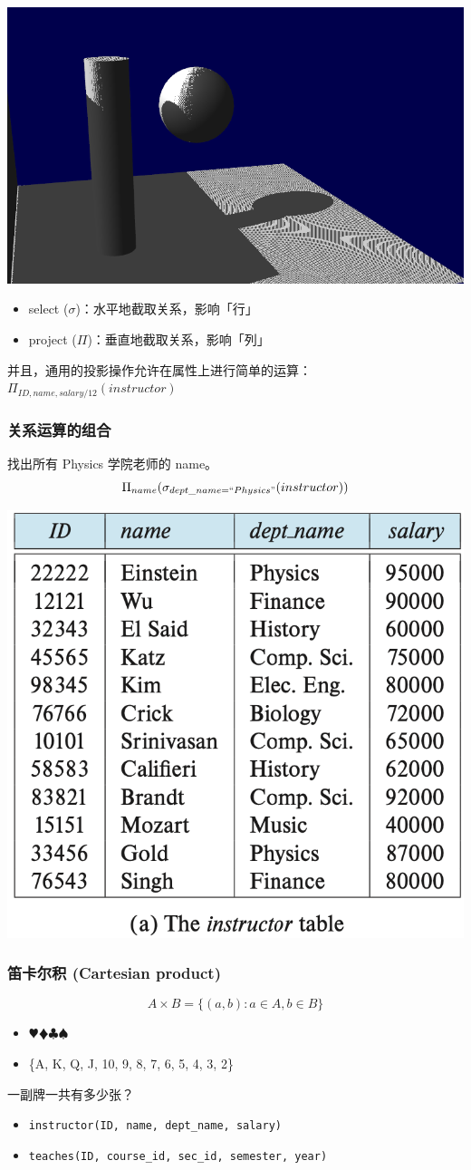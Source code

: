 \documentclass[aspectratio=169, 14pt]{beamer}
\begin{document}
\begin{frame}
	\begin{center}
		\includegraphics[width=.45\textwidth]{image/project}
	\end{center}

	\begin{itemize}
		\item select ($\sigma$)：\alert{水平地}截取关系，影响「行」
		\item project ($\Pi$)：\alert{垂直地}截取关系，影响「列」
	\end{itemize}
	\pause
	并且，通用的投影操作允许在属性上进行简单的运算：\large{\(\Pi_{ID, name, salary/12}(instructor)\)}

\end{frame}

\begin{frame}
	\frametitle{关系运算的组合}
	找出所有 Physics 学院老师的 name。
	{\large \[\Pi_{name}(\sigma_{dept\_name=``Physics"}(instructor))\]}
	\begin{center}
		\includegraphics[width=.55\textwidth, trim={0 4.4cm 0 0},clip]{table/instructor}
	\end{center}

\end{frame}

\begin{frame}
	\frametitle{笛卡尔积 (Cartesian product)}
	\[A \times B = \{(a, b): a \in A, b \in B\}\]
	\pause
	\begin{itemize}
		\item $\varheart\vardiamond\clubsuit\spadesuit$
		\item \{A, K, Q, J, 10, 9, 8, 7, 6, 5, 4, 3, 2\}
	\end{itemize}
	{\large {}} 一副牌一共有多少张？

	\pause
	\begin{itemize}
		\item \texttt{instructor(ID, name, dept\_name, salary)}
		\item \texttt{teaches(ID, course\_id, sec\_id, semester, year)}
	\end{itemize}
\end{frame}
\end{document}
